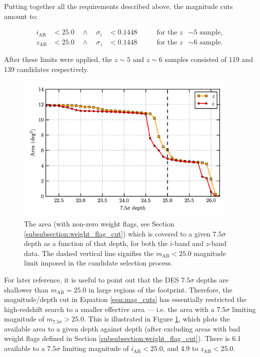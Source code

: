 Putting together all the requirements described above, the magnitude cuts amount to: 

\begin{equation}
\begin{alignedat}{4}
 i_{\mathrm{AB}} & < 25.0 \quad \land \quad \sigma_{i} & < 0.1448 \qquad &\text{for the } z & \sim 5 \text{ sample}, \\
 z_{\mathrm{AB}} & < 25.0 \quad \land \quad \sigma_{z} & < 0.1448 \qquad &\text{for the } z & \sim 6 \text{ sample}.
\end{alignedat}
\label{eqn:mag_cuts}
\end{equation}

\noindent After these limits were applied, the $z\sim5$ and $z\sim6$ samples consisted of 119 and 139 candidates respectively.  \par

\begin{figure}[t]
\centering
\includegraphics[width=0.95\textwidth]{Chapter4/Figs/area_depth_plot_7_5sig.png}
\caption[Area as a function of \texorpdfstring{$7.5\sigma$}{} depth for the \DESVIDEO footprint]{The area (with non-zero weight flags, see Section \ref{subsubsection:weight_flag_cut}) which is covered to a given $7.5\sigma$ depth as a function of that depth, for both the $i$-band and $z$-band data. The dashed vertical line signifies the $m_{\mathrm{AB}}< 25.0$ magnitude limit imposed in the candidate selection process.}
\label{fig:area_depth_7_5}
\end{figure}

For later reference, it is useful to point out that the DES $7.5\sigma$ depths are shallower than $m_{\mathrm{AB}} = 25.0$ in large regions of the \DESVIDEO footprint. Therefore, the magnitude/depth cut in Equation \ref{eqn:mag_cuts} has essentially restricted the high-redshift search to a smaller effective area --- i.e. the area with a $7.5\sigma$ limiting magnitude of $m_{7.5\sigma} > 25.0$. This is illustrated in Figure \ref{fig:area_depth_7_5}, which plots the available area to a given depth against depth (after excluding areas with bad weight flags defined in Section \ref{subsubsection:weight_flag_cut}). There is \SI{6.1}{\sqdeg} available to a $7.5\sigma$ limiting magnitude of $i_{\mathrm{AB}}< 25.0$, and \SI{4.9}{\sqdeg} to $z_{\mathrm{AB}}< 25.0$. \par 



